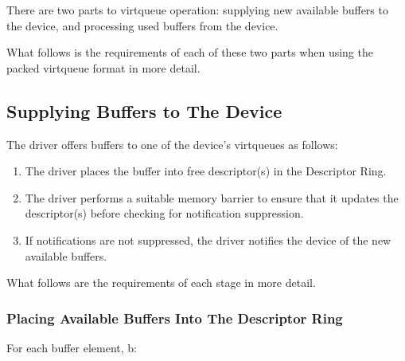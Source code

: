 There are two parts to virtqueue operation: supplying new
available buffers to the device, and processing used buffers from
the device.

What follows is the requirements of each of these two parts
when using the packed virtqueue format in more detail.

\subsection{Supplying Buffers to The Device}\label{sec:Basic Facilities of a Virtio Device / Packed Virtqueues / Supplying Buffers to The Device}

The driver offers buffers to one of the device's virtqueues as follows:

\begin{enumerate}
\item The driver places the buffer into free descriptor(s) in the Descriptor Ring.

\item The driver performs a suitable memory barrier to ensure that it updates
  the descriptor(s) before checking for notification suppression.

\item If notifications are not suppressed, the driver notifies the device
    of the new available buffers.
\end{enumerate}

What follows are the requirements of each stage in more detail.

\subsubsection{Placing Available Buffers Into The Descriptor Ring}\label{sec:Basic Facilities of a Virtio Device / Virtqueues / Supplying Buffers to The Device / Placing Available Buffers Into The Descriptor Ring}

For each buffer element, b:

